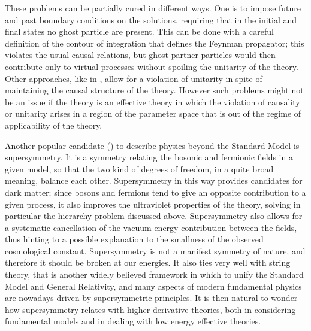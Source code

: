 


These problems can be partially cured in different ways. One is to impose future and past boundary conditions on the solutions, requiring that in the initial and final states no ghost particle are present. This can be done with a careful definition of the contour of integration that defines the Feynman propagator; this violates the usual causal relations, but ghost partner particles would then contribute only to virtual processes without spoiling the unitarity of the theory. Other approaches, like in \cite{Hawking:2001yt,Ghilencea:2007ex}, allow for a violation of unitarity in spite of maintaining the causal structure of the theory. However such problems might not be an issue if the theory is an effective theory in which the violation of causality or unitarity arises in a region of the parameter space that is out of the regime of applicability of the theory.




\vspace{1.5em}



Another popular candidate (\cite{Tommaso, WB, Sohnius:1985qm}) to describe physics beyond the Standard Model is supersymmetry. It is a symmetry relating the bosonic and fermionic fields in a given model, so that the two kind of degrees of freedom, in a quite  broad meaning, balance each other. 
Supersymmetry in this way provides candidates for dark matter; since bosons and fermions tend to give an opposite contribution to a given process, it also improves the ultraviolet properties of the theory, solving in particular the hierarchy problem discussed above. Supersymmetry also allows for a systematic cancellation of the vacuum energy contribution between the fields, thus hinting to a possible explanation to the smallness of the observed cosmological constant. Supersymmetry is not a manifest symmetry of nature, and therefore it should be broken at our energies. It also ties very well with string theory, that is another widely believed framework in which to unify the Standard Model and General Relativity, and many aspects of modern fundamental physics are nowadays driven by supersymmetric principles. 
It is then natural to wonder how supersymmetry relates with higher derivative theories, both in considering fundamental models and in dealing with low energy effective theories.




